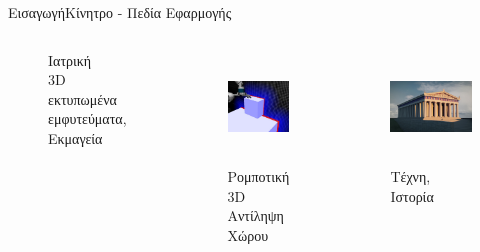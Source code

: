 \documentclass[10pt]{beamer}
\begin{document}
\begin{frame}{Eισαγωγή}{Κίνητρο - Πεδία Εφαρμογής}
\begin{columns}
\begin{figure}
        \caption{Ιατρική \\\small{3D εκτυπωμένα εμφυτεύματα, \\Εκμαγεία}}
    \end{figure}
    \begin{figure}
        \centering
        \includegraphics[height=0.83\textwidth]{images/Visualizing-a-two-dimensional-slice-of-the-signed-distance-field-SDF-PH-Blue-voxels.jpg}
        \caption{Ρομποτική \\ \small{ 3D Αντίληψη Χώρου}}
    \end{figure}
    \begin{figure}
        \centering
        \includegraphics[height=0.83\textwidth]{images/parthenon3drecon.jpg}
        \caption{Τέχνη, Ιστορία}
    \end{figure}
\end{columns}


\end{frame}
\end{document}
